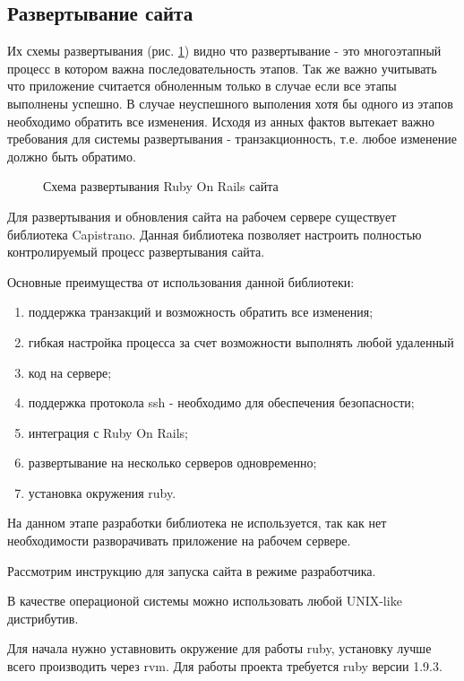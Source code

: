 \subsection{Развертывание сайта}
Их схемы развертывания (рис. \ref{ris:deployment_sait}) видно что развертывание - это
многоэтапный процесс в котором важна последовательность этапов. Так же важно учитывать что приложение
считается обноленным только в случае если все этапы выполнены успешно. В случае
неуспешного выполения хотя бы одного из этапов необходимо обратить все
изменения. Исходя из анных фактов вытекает важно требования для системы
развертывания - транзакционность, т.е. любое изменение должно быть обратимо.

\begin{figure}[h!]
\caption{Схема развертывания Ruby On Rails сайта}
\label{ris:deployment_sait}
\end{figure}

Для развертывания и обновления сайта на рабочем сервере существует библиотека
Capistrano. Данная библиотека позволяет настроить полностью контролируемый
процесс развертывания сайта.

Основные преимущества от использования данной библиотеки:
\begin{enumerate}
  \item поддержка транзакций и возможность обратить все изменения;
  \item гибкая настройка процесса за счет возможности выполнять любой удаленный
  \item код на сервере; 
  \item поддержка протокола ssh - необходимо для обеспечения безопасности; 
  \item интеграция с Ruby On Rails;
  \item развертывание на несколько серверов одновременно;
  \item установка окружения ruby.
\end{enumerate}

На данном этапе разработки библиотека не используется, так как нет необходимости
разворачивать приложение на рабочем сервере.

Рассмотрим инструкцию для запуска сайта в режиме разработчика.

В качестве операционой системы можно использовать любой UNIX-like дистрибутив.

Для начала нужно уставновить окружение для работы ruby, установку лучше всего
производить через rvm. Для работы проекта требуется ruby версии 1.9.3.

